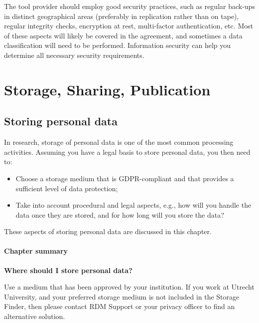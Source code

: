 \documentclass[
]{book}
\providecommand{\tightlist}{%
  \setlength{\itemsep}{0pt}\setlength{\parskip}{0pt}}
\begin{document}
The tool provider should employ good security practices, such as regular back-ups
in distinct geographical areas (preferably in replication rather than on tape),
regular integrity checks, encryption at rest, multi-factor authentication, etc.
Most of these aspects will likely be covered in the agreement, and sometimes a
data classification will need to be performed.
Information security can help you determine all
necessary security requirements.

\hypertarget{part-storage-sharing-publication}{%
\part*{Storage, Sharing, Publication}\label{part-storage-sharing-publication}}

\hypertarget{data-storage}{%
\chapter{Storing personal data}\label{data-storage}}

In research, storage of personal data is one of the most common processing
activities. Assuming you have a legal basis to store personal data, you
then need to:

\begin{itemize}
\tightlist
\item
  Choose a storage medium that is GDPR-compliant and that provides a sufficient
  level of data protection;
\item
  Take into account procedural and legal aspects, e.g., how will you handle the
  data once they are stored, and for how long will you store the data?
\end{itemize}

These aspects of storing personal data are discussed in this chapter.

\hypertarget{chapter-summary-1}{%
\subsection{Chapter summary}\label{chapter-summary-1}}

\textbf{Where should I store personal data?}

Use a medium that has been approved by your institution. If you work at Utrecht
University, and your preferred storage medium is not included in the
Storage Finder,
then please contact
RDM Support
or your privacy officer
to find an alternative solution.
\end{document}
